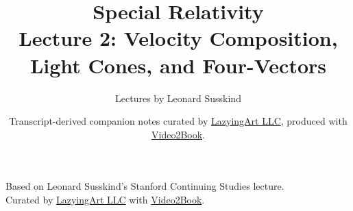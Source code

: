 \documentclass[11pt,oneside]{book}
\begin{document}
\frontmatter
\title{Special Relativity\\Lecture 2: Velocity Composition, Light Cones, and Four-Vectors}
\author{Lectures by Leonard Susskind}
\date{Transcript-derived companion notes curated by \href{https://lazying.art}{LazyingArt LLC}, produced with \href{https://github.com/lachlanchen/Video2Book}{Video2Book}.}
\maketitle
\setcounter{page}{2}
\begin{center}
\small Based on Leonard Susskind's Stanford Continuing Studies lecture.\\
Curated by \href{https://lazying.art}{LazyingArt LLC} with \href{https://github.com/lachlanchen/Video2Book}{Video2Book}.
\end{center}
\clearpage
\mainmatter

\end{document}
